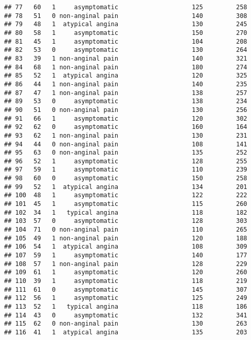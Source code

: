 \documentclass[]{article}
\begin{document}
\begin{verbatim}
## 77   60   1     asymptomatic                    125         258
## 78   51   0 non-anginal pain                    140         308
## 79   48   1  atypical angina                    130         245
## 80   58   1     asymptomatic                    150         270
## 81   45   1     asymptomatic                    104         208
## 82   53   0     asymptomatic                    130         264
## 83   39   1 non-anginal pain                    140         321
## 84   68   1 non-anginal pain                    180         274
## 85   52   1  atypical angina                    120         325
## 86   44   1 non-anginal pain                    140         235
## 87   47   1 non-anginal pain                    138         257
## 89   53   0     asymptomatic                    138         234
## 90   51   0 non-anginal pain                    130         256
## 91   66   1     asymptomatic                    120         302
## 92   62   0     asymptomatic                    160         164
## 93   62   1 non-anginal pain                    130         231
## 94   44   0 non-anginal pain                    108         141
## 95   63   0 non-anginal pain                    135         252
## 96   52   1     asymptomatic                    128         255
## 97   59   1     asymptomatic                    110         239
## 98   60   0     asymptomatic                    150         258
## 99   52   1  atypical angina                    134         201
## 100  48   1     asymptomatic                    122         222
## 101  45   1     asymptomatic                    115         260
## 102  34   1   typical angina                    118         182
## 103  57   0     asymptomatic                    128         303
## 104  71   0 non-anginal pain                    110         265
## 105  49   1 non-anginal pain                    120         188
## 106  54   1  atypical angina                    108         309
## 107  59   1     asymptomatic                    140         177
## 108  57   1 non-anginal pain                    128         229
## 109  61   1     asymptomatic                    120         260
## 110  39   1     asymptomatic                    118         219
## 111  61   0     asymptomatic                    145         307
## 112  56   1     asymptomatic                    125         249
## 113  52   1   typical angina                    118         186
## 114  43   0     asymptomatic                    132         341
## 115  62   0 non-anginal pain                    130         263
## 116  41   1  atypical angina                    135         203

\end{verbatim}
\end{document}
